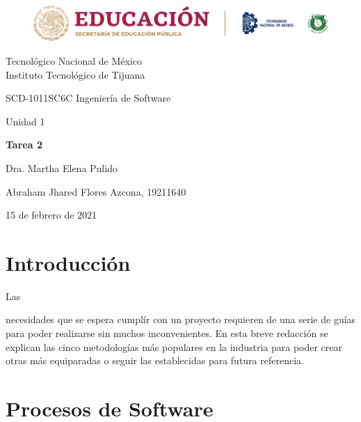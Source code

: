 \documentclass[stu, 12pt, letterpaper, donotrepeattitle, floatsintext, natbib]{apa7}
\begin{document}
    \begin{titlepage}
        \begin{figure}[ht]
            \centering
            \includegraphics[width=15cm]{logosITT.png}
        \end{figure}
        \centering
        {\Large Tecnológico Nacional de México\\Instituto Tecnológico de Tijuana\par}
        \vspace{1cm}
        {\Large SCD-1011SC6C Ingeniería de Software\par}
        \vspace{1cm}
        {\Large Unidad 1\par}
        \vspace{2cm}
        {\Large\bfseries Tarea 2\par}
        \vspace{2cm}
        {\large Dra. Martha Elena Pulido\par}
        \vfill
            {\large Abraham Jhared Flores Azcona, 19211640\par}
        \vfill
        {\large 15 de febrero de 2021}
    \end{titlepage}

\renewcommand\contentsname{Contenido}
\tableofcontents

\newpage
\section{Introducción}
Las \begin{justifying}
    necesidades que se espera cumplír con un proyecto requieren de una serie de guías para poder realizarse sin muchos inconvenientes. En esta breve redacción se explican las cinco
    metodologías más populares en la industria para poder crear otras más equiparadas o seguir las establecidas para futura referencia.\par
    \end{justifying}
\vspace{\baselineskip}    
\section{Procesos de Software}
\end{document}
